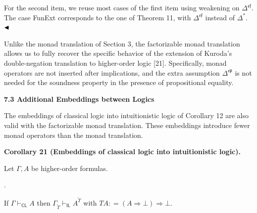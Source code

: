 \documentclass[10pt,a4paper]{article}
\begin{document}
 
  
For the second item, we reuse most cases of the first item using weakening on $\Delta^{\mathfrak{e}\mathfrak{f}}$. The case FunExt corresponds to the one of Theorem 11, with $\Delta^{\mathfrak{e}\mathfrak{f}}$ instead of $\Delta^{*}$. $\hfill\blacktriangleleft$\par
 
 
 
Unlike the monad translation of Section 3, the factorizable monad translation allows us to fully recover the specific behavior of the extension of Kuroda’s double-negation translation to higher-order logic [21]. Specifically, monad operators are not inserted after implications, and the extra assumption $\Delta^{\mathfrak{e}\mathfrak{p}}$ is not needed for the soundness property in the presence of propositional equality.\par
 
 
 
 
 
\par\medskip\noindent\textbf{7.3 Additional Embeddings between Logics}\par
 
 
The embeddings of classical logic into intuitionistic logic of Corollary 12 are also valid with the factorizable monad translation. These embeddings introduce fewer monad operators than the monad translation.\par
 
 
 
\par\medskip\noindent\textbf{Corollary 21 (Embeddings of classical logic into intuitionistic logic).}\par
 
 
Let $\Gamma,A$ be higher-order formulas.\par
  
\par{}. 
 
If $\Gamma\vdash_{\mathsf{CL}}A$ then $\Gamma_{\widetilde{T}}\vdash_{\mathsf{IL}}A^{\widetilde{T}}$ with $TA\mathrel{\mathop{:}}=(A\mathbin{\Rightarrow}\bot)\mathbin{\Rightarrow}\bot$.\par
 
\end{document}
